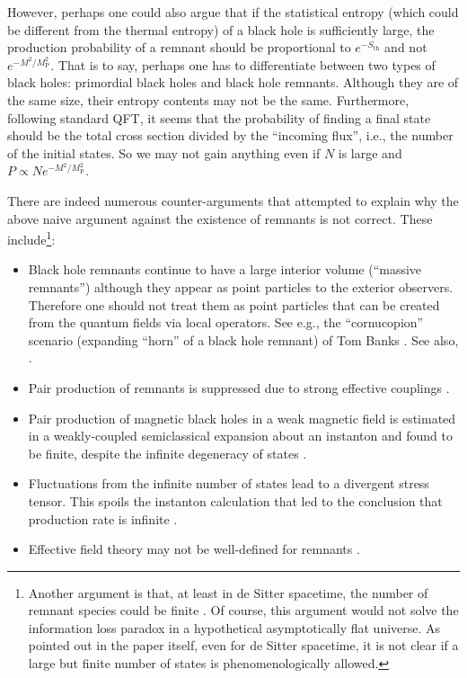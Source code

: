 \documentclass[12pt]{article}
\newcommand{\2}{$^2$}
\newcommand{\3}{$^3$}
\newcommand{\4}{$_4$}
\newcommand{\5}{$_5$}
\begin{document}
However, perhaps one could also argue that if the statistical entropy (which could be different from the thermal entropy) of a black hole is sufficiently large, the production probability of a remnant should be proportional to $e^{-S_{\mathrm{th}}}$ and not $e^{-M^{2}/M_{\text{P}}^2}$. That is to say, perhaps one has to differentiate between two types of black holes: primordial black holes and black hole remnants. Although they are of the same size, their entropy contents may not be the same.
Furthermore, following standard QFT, it seems that the probability of finding a final state should be the total cross section divided by the ``incoming flux'', i.e., the number of the initial states. So we may not gain anything even if $N$ is large and $P \propto N e^{-M^{2}/M_{\text{P}}^2}$.

There are indeed numerous counter-arguments that attempted to explain why the above naive argument against the existence of remnants is not correct. These include\footnote{Another argument is that, at least in de Sitter spacetime, the number of remnant species could be finite \cite{0803.2467}. Of course, this argument would not solve the information loss paradox in a hypothetical asymptotically flat universe. As pointed out in the paper itself, even for de Sitter spacetime, it is not clear if a large but finite number of states is phenomenologically allowed.}:
\begin{itemize}
\item[(1)] Black hole remnants continue to have a large interior volume (``massive remnants'') although they appear as point particles to the exterior observers. Therefore one should not treat them as point particles that can be created from the quantum fields via local operators. See e.g., the ``cornucopion'' scenario (expanding ``horn'' of a black hole
remnant) of Tom Banks \cite{Banks}. See also, \cite{piran}.
\item[(2)] Pair production of remnants is suppressed due to strong effective couplings \cite{Giddings3}.
\item[(3)] Pair production of magnetic black holes in a weak magnetic field is estimated in a weakly-coupled semiclassical expansion about an instanton and found to be finite, despite the infinite degeneracy of states \cite{BLS}.
\item[(4)] Fluctuations from the infinite number of states lead to a divergent stress tensor. This spoils the instanton calculation that led to the conclusion that production rate is infinite \cite{Giddings01}. 
\item[(5)] Effective field theory may not be well-defined for remnants \cite{sabine}. 
\end{itemize}
\end{document}
